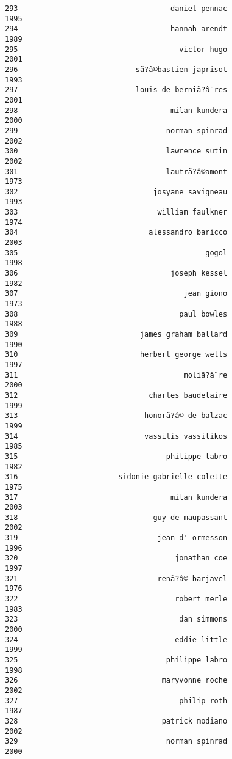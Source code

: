 \documentclass[
]{report}
\begin{document}
\begin{verbatim}
293                                   daniel pennac                1995
294                                   hannah arendt                1989
295                                     victor hugo                2001
296                           sã?â©bastien japrisot                1993
297                           louis de berniã?â¨res                2001
298                                   milan kundera                2000
299                                  norman spinrad                2002
300                                  lawrence sutin                2002
301                                  lautrã?â©amont                1973
302                               josyane savigneau                1993
303                                william faulkner                1974
304                              alessandro baricco                2003
305                                           gogol                1998
306                                   joseph kessel                1982
307                                      jean giono                1973
308                                     paul bowles                1988
309                            james graham ballard                1990
310                            herbert george wells                1997
311                                      moliã?â¨re                2000
312                              charles baudelaire                1999
313                             honorã?â© de balzac                1999
314                             vassilis vassilikos                1985
315                                  philippe labro                1982
316                       sidonie-gabrielle colette                1975
317                                   milan kundera                2003
318                               guy de maupassant                2002
319                                jean d' ormesson                1996
320                                    jonathan coe                1997
321                                renã?â© barjavel                1976
322                                    robert merle                1983
323                                     dan simmons                2000
324                                    eddie little                1999
325                                  philippe labro                1998
326                                 maryvonne roche                2002
327                                     philip roth                1987
328                                 patrick modiano                2002
329                                  norman spinrad                2000

\end{verbatim}
\end{document}
